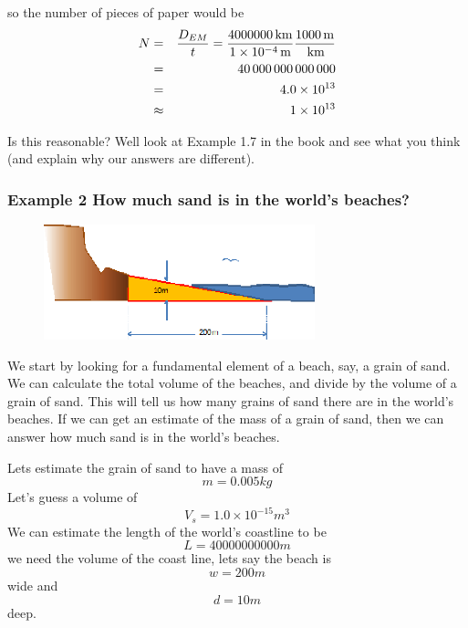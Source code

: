 \documentclass[]{Book}
\begin{document}
so the number of pieces of paper would be%
\begin{eqnarray}
	N &=&\frac{D_{EM}}{t}=\frac{4000000\unit{km}}{1\times 10^{-4}\unit{m}}\frac{%
		1000\unit{m}}{\unit{km}} \\
	&=&40\,000\,\allowbreak 000\,000\,000  \notag \\
	&=&4.0\times 10^{13}  \notag \\
	&\approx &1\times 10^{13}
\end{eqnarray}

Is this reasonable? Well look at Example 1.7 in the book and see what you
think (and explain why our answers are different).

\subsubsection{Example 2 How much sand is in the world's beaches?}

\begin{figure}[h!]
	\begin{center}
		\includegraphics[width=0.7\textwidth]{Beach}			
		\label{fig:Beach}
	\end{center}
\end{figure}





We start by looking for a fundamental element of a beach, say, a grain of
sand. We can calculate the total volume of the beaches, and divide by the
volume of a grain of sand. This will tell us how many grains of sand there
are in the world's beaches. If we can get an estimate of the mass of a grain
of sand, then we can answer how much sand is in the world's beaches.

Lets estimate the grain of sand to have a mass of 
\begin{equation}
	m=0.005\unit{kg}
\end{equation}%
Let's guess a volume of%
\begin{equation}
	V_{s}=\allowbreak 1.0\times 10^{-15}\unit{m}^{3}
\end{equation}
We can estimate the length of the world's coastline to be%
\begin{equation}
	L=40000000000\unit{m}
\end{equation}%
we need the volume of the coast line, lets say the beach is 
\begin{equation}
	w=200\unit{m}
\end{equation}
wide and 
\begin{equation}
	d=10\unit{m}
\end{equation}
deep.
\end{document}
